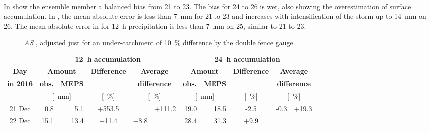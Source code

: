 \\
In  show the ensemble member a balanced bias from \num{21} to \SI{23}{\dec}. The bias for \num{24} to \SI{26}{\dec} is wet, also showing the overestimation of surface accumulation.
In , the mean absolute error is less than \SI{7}{\mm} for \num{21} to \SI{23}{\dec} and increases with intensification of the storm up to \SI{14}{\mm} on \SI{26}{\dec}. The mean absolute error in  for \SI{12}{\hour} precipitation is less than \SI{7}{\mm} on \SI{25}{\dec}, similar to \num{21} to \SI{23}{\dec}.
\begin{table}[t]
	\begin{center}
		\caption{ \textit{AS }, adjusted just for an under-catchment of \SI{10}{\percent} difference by the double fence gauge. }\label{tab:res:MEPS_err_10}
		\begin{tabular}{c||r|r|c|c|c||r|r|c|c|c}
			\hline \hline
			& \multicolumn{5}{c||}{\textbf{\SI{12}{\hour} accumulation}} & \multicolumn{5}{c}{\textbf{\SI{24}{\hour} accumulation}}    \\ \cline{2-11}
			\textbf{Day} & \multicolumn{2}{c|}{\textbf{Amount}} & \textbf{Difference} & \multicolumn{2}{c||}{\textbf{Average}} &  \multicolumn{2}{c|}{\textbf{Amount}} & \textbf{Difference} & \multicolumn{2}{c}{\textbf{Average}}  \\\cline{2-3} \cline{7-8}
			\textbf{in 2016} & \textbf{obs.} & \textbf{MEPS} & & \multicolumn{2}{c||}{\textbf{difference}} & \textbf{obs.} & \textbf{MEPS} & & \multicolumn{2}{c}{\textbf{difference}} \\\cline{2-11}
			& \multicolumn{2}{c|}{[\SI{}{\mm}]} & [\SI{}{\percent}] & \multicolumn{2}{c||}{ [\SI{}{\percent}]} & \multicolumn{2}{c|}{[\SI{}{\mm}]} & [\SI{}{\percent}] & \multicolumn{2}{c}{ [\SI{}{\percent}]} \\ \hline\hline
			\num{21} Dec & \num{0.8} & \num{5.1} & +\num{553.5} &  &\multirow{6}{*}{+\num{111.2}} & \num{19.0} & \num{18.5} & -\num{2.5} & \multirow{3}{*}{-\num{0.3}}& \multirow{6}{*}{+\num{19.3}}   \\\cline{1-5}\cline{7-9} 
			\num{22} Dec & \num{15.1} & \num{13.4} & \num{-11.4} & \multirow{2}{*}{\num{-8.8}} & & \num{28.4} & \num{31.3} & +\num{9.9} &  &  \\\cline{1-4}\cline{7-9}

\end{tabular}
\end{center}
\end{table}
